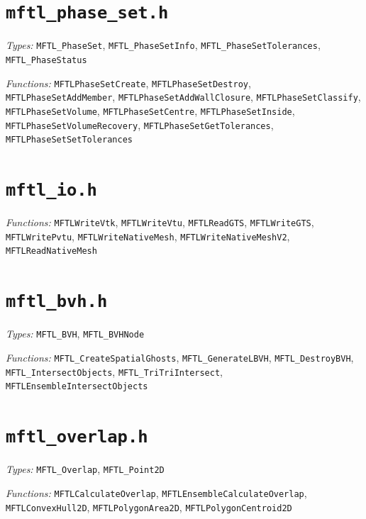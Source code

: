 \section*{\texttt{mftl\_phase\_set.h}}
\textit{Types:} \texttt{MFTL\_PhaseSet}, \texttt{MFTL\_PhaseSetInfo}, \texttt{MFTL\_PhaseSetTolerances}, \texttt{MFTL\_PhaseStatus}\par
\textit{Functions:} \texttt{MFTLPhaseSetCreate}, \texttt{MFTLPhaseSetDestroy}, \texttt{MFTLPhaseSetAddMember}, \texttt{MFTLPhaseSetAddWallClosure}, \texttt{MFTLPhaseSetClassify}, \texttt{MFTLPhaseSetVolume}, \texttt{MFTLPhaseSetCentre}, \texttt{MFTLPhaseSetInside}, \texttt{MFTLPhaseSetVolumeRecovery}, \texttt{MFTLPhaseSetGetTolerances}, \texttt{MFTLPhaseSetSetTolerances}\par

\section*{\texttt{mftl\_io.h}}
\textit{Functions:} \texttt{MFTLWriteVtk}, \texttt{MFTLWriteVtu}, \texttt{MFTLReadGTS}, \texttt{MFTLWriteGTS}, \texttt{MFTLWritePvtu}, \texttt{MFTLWriteNativeMesh}, \texttt{MFTLWriteNativeMeshV2}, \texttt{MFTLReadNativeMesh}\par

\section*{\texttt{mftl\_bvh.h}}
\textit{Types:} \texttt{MFTL\_BVH}, \texttt{MFTL\_BVHNode}\par
\textit{Functions:} \texttt{MFTL\_CreateSpatialGhosts}, \texttt{MFTL\_GenerateLBVH}, \texttt{MFTL\_DestroyBVH}, \texttt{MFTL\_IntersectObjects}, \texttt{MFTL\_TriTriIntersect}, \texttt{MFTLEnsembleIntersectObjects}\par

\section*{\texttt{mftl\_overlap.h}}
\textit{Types:} \texttt{MFTL\_Overlap}, \texttt{MFTL\_Point2D}\par
\textit{Functions:} \texttt{MFTLCalculateOverlap}, \texttt{MFTLEnsembleCalculateOverlap}, \texttt{MFTLConvexHull2D}, \texttt{MFTLPolygonArea2D}, \texttt{MFTLPolygonCentroid2D}\par

